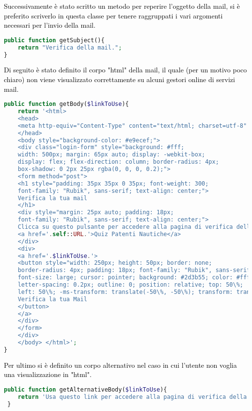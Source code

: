   \textcolor{black}{Successivamente è stato scritto un metodo per reperire l'oggetto della mail, si è preferito scriverlo in questa classe per tenere raggruppati i vari argomenti necessari per l'invio della mail.}\\
 
\begin{lstlisting}[language=php]
public function getSubject(){
	return "Verifica della mail.";
}
\end{lstlisting}

\textcolor{black}{Di seguito è stato definito il corpo "html" della mail, il quale (per un motivo poco chiaro) non viene visualizzato correttamente su alcuni gestori online di servizi mail. }\\

\begin{lstlisting}[language=php]
public function getBody($linkToUse){
	return '<html>
	<head>
	<meta http-equiv="Content-Type" content="text/html; charset=utf-8" />
	</head>
	<body style="background-color: #e9ecef;">
	<div class="login-form" style="background: #fff;
	width: 500px; margin: 65px auto; display: -webkit-box;
	display: flex; flex-direction: column; border-radius: 4px;
	box-shadow: 0 2px 25px rgba(0, 0, 0, 0.2);">
	<form method="post">
	<h1 style="padding: 35px 35px 0 35px; font-weight: 300;
	font-family: "Rubik", sans-serif; text-align: center;">
	Verifica la tua mail
	</h1>
	<div style="margin: 25px auto; padding: 18px;
	font-family: "Rubik", sans-serif; text-align: center;">
	Clicca su questo pulsante per accedere alla pagina di verifica della mail inserita su:
	<a href='.self::URL.'>Quiz Patenti Nautiche</a>
	</div>
	<div>
	<a href='.$linkToUse.'>
	<button style="width: 250px; height: 50px; border: none;
	border-radius: 4px; padding: 18px; font-family: "Rubik", sans-serif;
	font-size: large; cursor: pointer; background: #2d3b55; color: #fff;
	letter-spacing: 0.2px; outline: 0; position: relative; top: 50\%;
	left: 50\%; -ms-transform: translate(-50\%, -50\%); transform: translate(-50\%, -50\%);">
	Verifica la tua Mail
	</button>
	</a>
	</div>
	</form>
	</div>
	</body>	</html>';
}
 \end{lstlisting}
 
 \textcolor{black}{Per ultimo si è definito un corpo alternativo nel caso in cui l'utente non voglia una visualizzazione in "html".}\\
 
  \begin{lstlisting}[language=php]
 public function getAlternativeBody($linkToUse){
 	return 'Usa questo link per accedere alla pagina di verifica della mail: '.$linkToUse;
 }
  \end{lstlisting}
  

